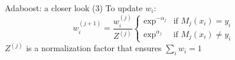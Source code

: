 \begin{frame}{Adaboost: a closer look (3)}
To update $w_i$:
\begin{equation*}
w_i^{(j+1)}=\frac{w_i^{(j)}}{Z^{(j)}}
  \begin{cases}
    \exp^{-\alpha_j} & \text{if $M_j(x_i)=y_i$} \\
    \exp^{\alpha_j} & \text{if $M_j(x_i)\neq y_i$}
  \end{cases}
\end{equation*}
$Z^{(j)}$ is a normalization factor that ensures $\sum_i w_i = 1$
\end{frame}
